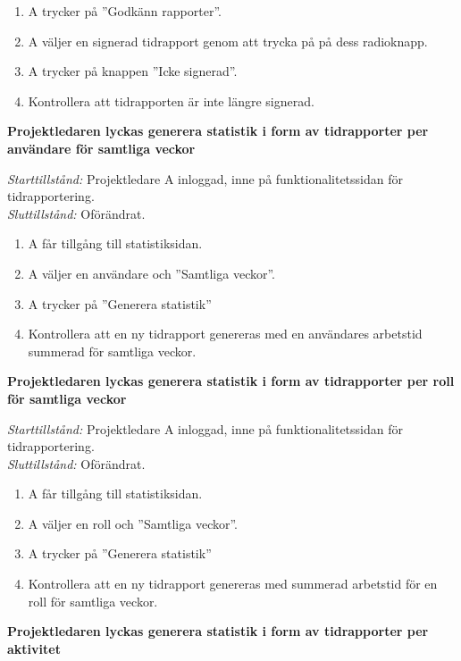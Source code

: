\documentclass[a4paper]{article}
\begin{document}
\begin{FT}
\begin{enumerate}
\item A trycker på ''Godkänn rapporter''.
\item A väljer en signerad tidrapport genom att trycka på på dess radioknapp.
\item A trycker på knappen ''Icke signerad''.
\item Kontrollera att tidrapporten är inte längre signerad.
\end{enumerate}



\item
\textbf{Projektledaren lyckas generera statistik i form av tidrapporter per användare för samtliga veckor}

\emph{Starttillstånd:} Projektledare A inloggad, inne på funktionalitetssidan för tidrapportering.\\
\emph{Sluttillstånd:} Oförändrat.

\begin{enumerate}
\item A får tillgång till statistiksidan.
\item A väljer en användare och ''Samtliga veckor''.
\item A trycker på ''Generera statistik''
\item Kontrollera att en ny tidrapport genereras med en användares arbetstid summerad för samtliga veckor.
\end{enumerate}



\item
\textbf{Projektledaren lyckas generera statistik i form av tidrapporter per roll för samtliga veckor}

\emph{Starttillstånd:} Projektledare A inloggad, inne på funktionalitetssidan för tidrapportering.\\
\emph{Sluttillstånd:} Oförändrat.

\begin{enumerate}
\item A får tillgång till statistiksidan.
\item A väljer en roll och ''Samtliga veckor''.
\item A trycker på ''Generera statistik''
\item Kontrollera att en ny tidrapport genereras med summerad arbetstid för en roll för samtliga veckor.
\end{enumerate}


\item
\textbf{Projektledaren lyckas generera statistik i form av tidrapporter per aktivitet}


\end{FT}
\end{document}
